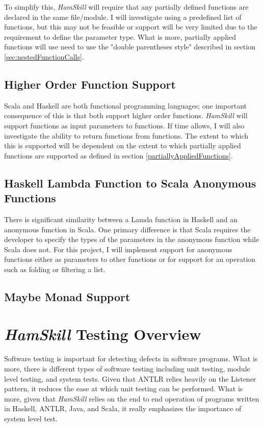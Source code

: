 \documentclass{report}
\begin{document}
To simplify this, \emph{HamSkill} will require that any partially defined functions are declared in the same file/module.  I will investigate using a predefined list of functions, but this may not be feasible or support will be very limited due to the requirement to define the parameter type.  What is more, partially applied functions will use need to use the "double parentheses style" described in section \ref{sec:nestedFunctionCalls}.

\subsection{Higher Order Function Support}\label{sec:higherOrderFunctions}

Scala and Haskell are both functional programming languages; one important consequence of this is that both support higher order functions.  \emph{HamSkill} will support functions as input parameters to functions.  If time allows, I will also investigate the ability to return functions from functions.  The extent to which this is supported will be dependent on the extent to which partially applied functions are supported as defined in section \ref{partiallyAppliedFunctions}.

\subsection{Haskell Lambda Function to Scala Anonymous Functions}\label{sec:lambdaAnonymousFunctions}

There is significant similarity between a Lamda function in Haskell and an anonymous function in Scala.  One primary difference is that Scala requires the developer to specify the types of the parameters in the anonymous function while Scala does not. For this project, I will implement support for anonymous functions either as parameters to other functions or for support for an operation such as folding or filtering a list. 

\subsection{Maybe Monad Support}

\section{\textit{HamSkill} Testing Overview}

Software testing is important for detecting defects in software programs.  What is more, there is different types of software testing including unit testing, module level testing, and system tests.  Given that ANTLR relies heavily on the Listener pattern, it reduces the ease at which unit testing can be performed.  What is more, given that \textit{HamSkill} relies on the end to end operation of programs written in Haskell, ANTLR, Java, and Scala, it really emphasizes the importance of system level test.
\end{document}
